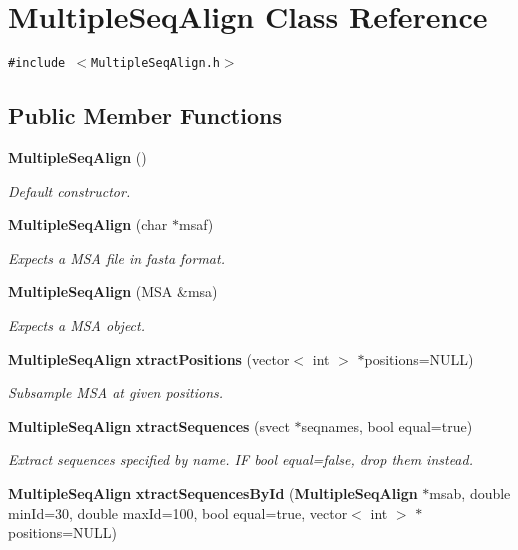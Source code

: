 \section{Multiple\-Seq\-Align Class Reference}
\label{classMultipleSeqAlign}
{\tt \#include $<$Multiple\-Seq\-Align.h$>$}

\subsection*{Public Member Functions}
\begin{CompactItemize}
\item 
{\bf Multiple\-Seq\-Align} ()\label{classMultipleSeqAlign_a0}

\begin{CompactList}\small\item\em Default constructor. \item\end{CompactList}\item 
{\bf Multiple\-Seq\-Align} (char $\ast$msaf)
\begin{CompactList}\small\item\em Expects a MSA file in fasta format. \item\end{CompactList}\item 
{\bf Multiple\-Seq\-Align} (MSA \&msa)\label{classMultipleSeqAlign_a2}

\begin{CompactList}\small\item\em Expects a MSA object. \item\end{CompactList}\item 
{\bf Multiple\-Seq\-Align} {\bf xtract\-Positions} (vector$<$ int $>$ $\ast$positions=NULL)\label{classMultipleSeqAlign_a3}

\begin{CompactList}\small\item\em Subsample MSA at given positions. \item\end{CompactList}\item 
{\bf Multiple\-Seq\-Align} {\bf xtract\-Sequences} (svect $\ast$seqnames, bool equal=true)\label{classMultipleSeqAlign_a4}

\begin{CompactList}\small\item\em Extract sequences specified by name. IF bool equal=false, drop them instead. \item\end{CompactList}\item 
{\bf Multiple\-Seq\-Align} {\bf xtract\-Sequences\-By\-Id} ({\bf Multiple\-Seq\-Align} $\ast$msab, double min\-Id=30, double max\-Id=100, bool equal=true, vector$<$ int $>$ $\ast$positions=NULL)\label{classMultipleSeqAlign_a5}


\end{CompactItemize}
